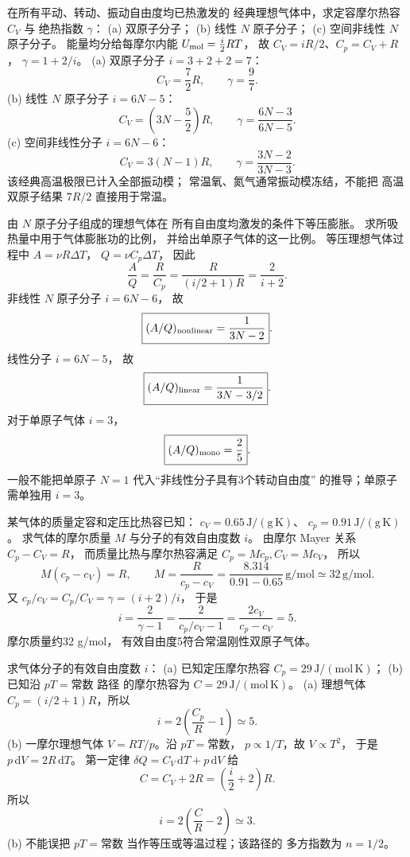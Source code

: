 在所有平动、转动、振动自由度均已热激发的
经典理想气体中，求定容摩尔热容 $C_V$ 与
绝热指数 $\gamma$：
(a) 双原子分子；
(b) 线性 $N$ 原子分子；
(c) 空间非线性 $N$ 原子分子。
\exsolution
能量均分给每摩尔内能
$U_{\rm mol}=\frac i2RT$，
故
$C_V=iR/2$、$C_p=C_V+R$，
$\gamma=1+2/i$。
(a) 双原子分子 $i=3+2+2=7$：
\[
\boxed{C_V=\frac72R,\qquad\gamma=\frac97}.
\]
(b) 线性 $N$ 原子分子
$i=6N-5$：
\[
\boxed{C_V=\left(3N-\frac52\right)R,\qquad
\gamma=\frac{6N-3}{6N-5}}.
\]
(c) 空间非线性分子
$i=6N-6$：
\[
\boxed{C_V=3(N-1)R,\qquad
\gamma=\frac{3N-2}{3N-3}}.
\]
\excheck 该经典高温极限已计入全部振动模；
常温氧、氮气通常振动模冻结，不能把
高温双原子结果 $7R/2$ 直接用于常温。

由 $N$ 原子分子组成的理想气体在
所有自由度均激发的条件下等压膨胀。
求所吸热量中用于气体膨胀功的比例，
并给出单原子气体的这一比例。
\exsolution
等压理想气体过程中
$A=\nu R\Delta T$，
$Q=\nu C_p\Delta T$，
因此
\[
\frac AQ=\frac R{C_p}
=\frac R{(i/2+1)R}=\frac2{i+2}.
\]
非线性 $N$ 原子分子 $i=6N-6$，
故
\[
\boxed{(A/Q)_{\rm nonlinear}=\frac1{3N-2}}.
\]
线性分子 $i=6N-5$，
故
\[
\boxed{(A/Q)_{\rm linear}=\frac1{3N-3/2}}.
\]
对于单原子气体 $i=3$，
\[
\boxed{(A/Q)_{\rm mono}=\frac25}.
\]
\excheck 一般不能把单原子 $N=1$
代入“非线性分子具有3个转动自由度”
的推导；单原子需单独用 $i=3$。

某气体的质量定容和定压比热容已知：
$c_V=0.65\,\mathrm{J/(g\,K)}$、
$c_p=0.91\,\mathrm{J/(g\,K)}$。
求气体的摩尔质量 $M$ 与分子的有效自由度数 $i$。
\exsolution
由摩尔 Mayer 关系 $C_p-C_V=R$，
而质量比热与摩尔热容满足
$C_p=Mc_p,C_V=Mc_V$，
所以
\[
M(c_p-c_V)=R,
\qquad
\boxed{M=\frac R{c_p-c_V}
=\frac{8.314}{0.91-0.65}\,\mathrm{g/mol}
\simeq32\,\mathrm{g/mol}}.
\]
又
$c_p/c_V=C_p/C_V=\gamma=(i+2)/i$，
于是
\[
\boxed{i=\frac2{\gamma-1}
=\frac2{c_p/c_V-1}
=\frac{2c_V}{c_p-c_V}=5}.
\]
\excheck 摩尔质量约32 g/mol，
有效自由度5符合常温刚性双原子气体。

求气体分子的有效自由度数 $i$：
(a) 已知定压摩尔热容
$C_p=29\,\mathrm{J/(mol\,K)}$；
(b) 已知沿 $pT=\text{常数}$ 路径
的摩尔热容为
$C=29\,\mathrm{J/(mol\,K)}$。
\exsolution
(a) 理想气体
$C_p=(i/2+1)R$，所以
\[
\boxed{i=2\left(\frac{C_p}{R}-1\right)
\simeq5}.
\]
(b) 一摩尔理想气体
$V=RT/p$。沿 $pT=\text{常数}$，
$p\propto1/T$，故 $V\propto T^2$，
于是
$p\,\mathrm dV=2R\,\mathrm dT$。
第一定律
$\delta Q=C_V\,\mathrm dT+p\,\mathrm dV$
给
\[
C=C_V+2R=\left(\frac i2+2\right)R.
\]
所以
\[
\boxed{i=2\left(\frac{C}{R}-2\right)
\simeq3}.
\]
\excheck (b) 不能误把 $pT=\text{常数}$
当作等压或等温过程；该路径的
多方指数为 $n=1/2$。
